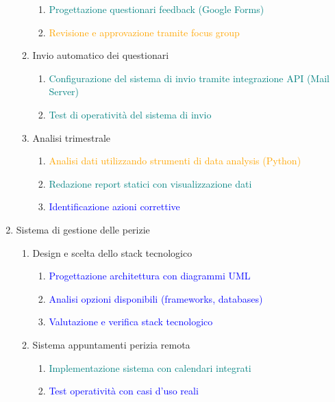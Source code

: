 \documentclass[a4paper,12pt, openright]{report}
\begin{document}
\begin{enumerate}
\begin{enumerate}
\begin{enumerate}
            \item \textcolor{teal}{Progettazione questionari feedback (Google Forms)} 
            \item \textcolor{orange}{Revisione e approvazione tramite focus group}
        \end{enumerate}
        \item Invio automatico dei questionari
        \begin{enumerate}
            \item \textcolor{teal}{Configurazione del sistema di invio tramite integrazione API (Mail Server)}
            \item \textcolor{teal}{Test di operatività del sistema di invio}
        \end{enumerate}
        \item Analisi trimestrale
        \begin{enumerate}
            \item \textcolor{orange}{Analisi dati utilizzando strumenti di data analysis (Python)}
            \item \textcolor{teal}{Redazione report statici con visualizzazione dati}
            \item \textcolor{blue}{Identificazione azioni correttive}
        \end{enumerate}
    \end{enumerate}
    \item Sistema di gestione delle perizie
    \begin{enumerate}
        \item Design e scelta dello stack tecnologico
        \begin{enumerate}
            \item \textcolor{blue}{Progettazione architettura con diagrammi UML}
            \item \textcolor{blue}{Analisi opzioni disponibili (frameworks, databases)}
            \item \textcolor{blue}{Valutazione e verifica stack tecnologico}
        \end{enumerate}
        \item Sistema appuntamenti perizia remota
        \begin{enumerate}
            \item \textcolor{teal}{Implementazione sistema con calendari integrati}
            \item \textcolor{blue}{Test operatività con casi d'uso reali}
        \end{enumerate}

\end{enumerate}
\end{enumerate}
\end{document}
